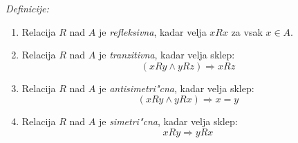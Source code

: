 \emph{Definicije:}
\begin{enumerate}[(1)]
	\item Relacija $R$ nad $A$ je \emph{refleksivna}, kadar velja $x R x$ za vsak $x \in A$.
	\item Relacija $R$ nad $A$ je \emph{tranzitivna}, kadar velja sklep:
	\begin{equation*}
	(x R y \land y R z) \Rightarrow x R z
	\end{equation*}
	
	\item Relacija $R$ nad $A$ je \emph{antisimetri"cna}, kadar velja sklep:
	\begin{equation*}
	(x R y \land y R x) \Rightarrow x = y
	\end{equation*}
	
	\item Relacija $R$ nad $A$ je \emph{simetri"cna}, kadar velja sklep:
	\begin{equation*}
	x R y \Rightarrow y R x
	\end{equation*}
\end{enumerate}
